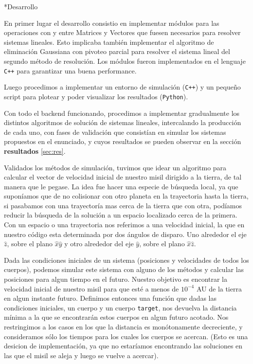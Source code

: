 \documentclass[12pt,titlepage]{article}
\newenvironment{usection}[1]{\newpage\begin{section}*{#1}	\addcontentsline{toc}{section}{#1}}{\end{section}}
\begin{document}
	\begin{usection}{Desarrollo}

		En primer lugar el desarrollo consistio en implementar módulos
		para las operaciones con y entre Matrices y Vectores que
		fuesen necesarios para resolver sistemas lineales. Esto
		implicaba también implementar el algoritmo de eliminación
		Gaussiana con pivoteo parcial para resolver el sistema lineal
		del segundo método de resolución. Los módulos fueron
		implementados en el lenguaje \texttt{C++} para garantizar una
		buena performance.

		Luego procedimos a implementar un entorno de simulación
		(\texttt{C++}) y un pequeño script para plotear y poder
		visualizar los resultados (\texttt{Python}). 

		Con todo el backend funcionando, procedimos a implementar
		gradualmente los distintos algoritmos de solución de sistemas
		lineales, intercalando la producción de cada uno, con fases de
		validación que consistían en simular los sistemas propuestos
		en el enunciado, y cuyos resultados se pueden observar en la
		sección \textbf{resultados} \ref{sec:res}.

		Validados los métodos de simulación, tuvimos que idear un
		algoritmo para calcular el vector de velocidad inicial de
		nuestro misil dirigido a la tierra, de tal manera que le pegase.
		La idea fue hacer una especie de búsqueda local, ya que
		suponíamos que de no colisionar con otro planeta en la
		trayectoria hasta la tierra, si pasabamos con una trayectoría
		mas cerca de la tierra que con otra, podíamos reducir la
		búsqueda de la solución a un espacio localizado cerca de la
		primera. Con un espacio o una trayectoria nos referimos a una
		velocidad inicial, la que en nuestro código esta determinada por
		dos ángulos de disparo. Uno alrededor el eje $\hat{z}$, sobre el
		plano $\hat{x}\hat{y}$ y otro alrededor del eje $\hat{y}$, sobre
		el plano $\hat{x}\hat{z}$.
		
		Dada las condiciones iniciales de un sistema (posiciones y velocidades de todos los cuerpos), podemos simular este sistema con alguno de los métodos y calcular las posiciones para algun tiempo en el futuro.
		Nuestro objetivo es encontrar la velocidad inicial de nuestro misil para que esté a menos de $10^{-4}$ AU de la tierra en algun instante futuro.
		Definimos entonces una función que dadas las condiciones iniciales, un cuerpo  y un cuerpo \texttt{target}, nos devuelva la distancia mínima a la que se encontrarán estos cuerpos en algun futuro acotado.
		Nos restringimos a los casos en los que la distancia es monótonamente decreciente, y consideramos sólo los tiempos para los cuales los cuerpos se acercan. (Esto es una desicion de implementación, ya que no estaríamos encontrando las soluciones en las que el misil se aleja y luego se vuelve a acercar).
		

	\end{usection}
\end{document}
